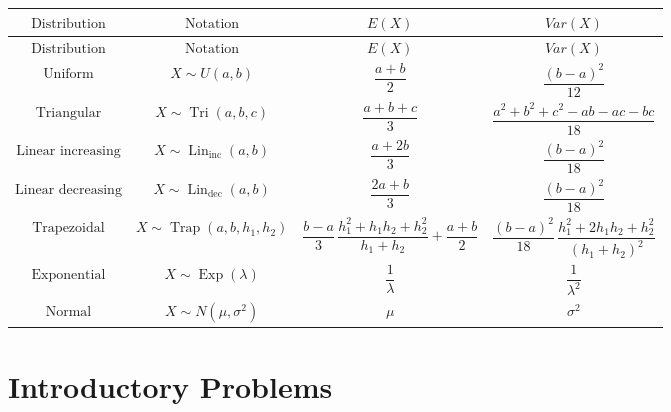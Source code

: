 	{
		\renewcommand{\arraystretch}{1.9}
		
		\begin{longtable}{c|c|c|c}
			$\text{Distribution}$
			&
			$\text{Notation}$
			&
			$E(X)$
			&
			$Var(X)$
			\\[1mm]
			\hline
			\endfirsthead
			
			$\text{Distribution}$
			&
			$\text{Notation}$
			&
			$E(X)$
			&
			$Var(X)$
			\\[1mm]
			\hline
			\endhead
			
			\hline
			\endfoot
			
			$\text{Uniform}$
			&
			$X\sim U(a,b)$
			&
			$\dfrac{a+b}{2}$
			&
			$\dfrac{(b-a)^2}{12}$
			\\[3mm]
			\hline
			
			$\text{Triangular}$
			&
			$X\sim \operatorname{Tri}(a,b,c)$
			&
			$\dfrac{a+b+c}{3}$
			&
			$\dfrac{a^2+b^2+c^2-ab-ac-bc}{18}$
			\\[3mm]
			\hline
			
			$\text{Linear increasing}$
			&
			$X\sim \operatorname{Lin}_{\mathrm{inc}}(a,b)$
			&
			$\dfrac{a+2b}{3}$
			&
			$\dfrac{(b-a)^2}{18}$
			\\[3mm]
			\hline
			
			$\text{Linear decreasing}$
			&
			$X\sim \operatorname{Lin}_{\mathrm{dec}}(a,b)$
			&
			$\dfrac{2a+b}{3}$
			&
			$\dfrac{(b-a)^2}{18}$
			\\[3mm]
			\hline
			
			$\text{Trapezoidal}$
			&
			$X\sim \operatorname{Trap}(a,b,h_1,h_2)$
			&
			$\dfrac{b-a}{3}\,
			\dfrac{h_1^2+h_1h_2+h_2^2}{h_1+h_2}
			+\dfrac{a+b}{2}$
			&
			$\dfrac{(b-a)^2}{18}\,
			\dfrac{h_1^2+2h_1h_2+h_2^2}{(h_1+h_2)^2}$
			\\[3mm]
			\hline
			
			$\text{Exponential}$
			&
			$X\sim \operatorname{Exp}(\lambda)$
			&
			$\dfrac{1}{\lambda}$
			&
			$\dfrac{1}{\lambda^2}$
			\\[3mm]
			\hline
			
			$\text{Normal}$
			&
			$X\sim N(\mu,\sigma^2)$
			&
			$\mu$
			&
			$\sigma^2$
			
		\end{longtable}
	}
	
	
	\newpage
	
\section{Introductory Problems}\label{sec:c4-problems}


